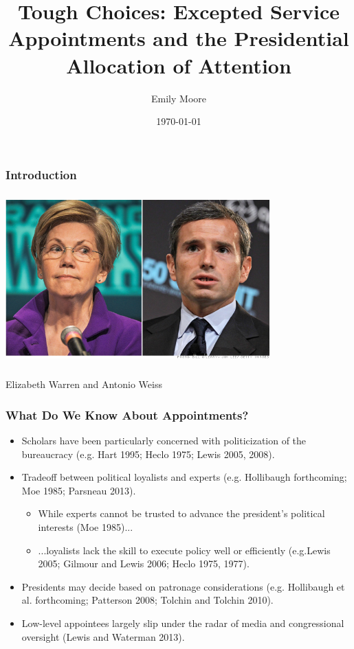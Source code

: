 \documentclass{beamer}
\title[ Tough Choices]{Tough Choices: Excepted Service Appointments and the Presidential Allocation of Attention}
\author{Emily Moore}
\institute[WUSTL]
{
Washington University-St. Louis \\
\medskip
{\emph{emily.moore@wustl.edu}}
}
\date{\today}
\begin{document}


%
\begin{frame}
\titlepage
\end{frame}
%
%
\begin{frame}
\frametitle{Introduction}
\begin{center}
\includegraphics[height=2.6in,width=4in]{WarrenWeiss.png}

Elizabeth Warren and Antonio Weiss
\end{center}

\end{frame}

\begin{frame}

\frametitle{What Do We Know About Appointments?}
\begin{itemize}\addtolength{\itemsep}{0.25\baselineskip}
\item Scholars have been particularly concerned with politicization of the bureaucracy (e.g. Hart 1995; Heclo 1975; Lewis 2005, 2008). 
\item Tradeoff between political loyalists and experts (e.g. Hollibaugh forthcoming; Moe 1985; Parsneau 2013).
\begin{itemize}
\item While experts cannot be trusted to advance the president's political interests (Moe 1985)...
\item ...loyalists lack the skill to execute policy well or efficiently (e.g.Lewis 2005; Gilmour and Lewis 2006; Heclo 1975, 1977).
\end{itemize}
\item Presidents may decide based on patronage considerations (e.g. Hollibaugh et al. forthcoming; Patterson 2008; Tolchin and Tolchin 2010).
\item Low-level appointees largely slip under the radar of media and congressional oversight (Lewis and Waterman 2013).  
\end{itemize}
\end{frame}
\end{document}
